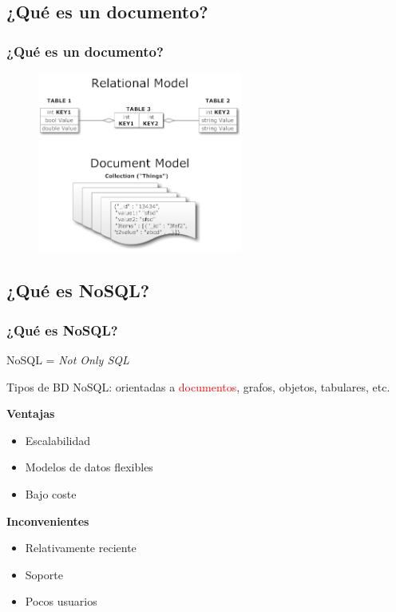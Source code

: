 \documentclass[serif,12pt]{beamer}
\begin{document}
\subsection{¿Qué es un documento?}
\begin{frame}
\frametitle{¿Qué es un documento?}

\begin{figure}
\centering
\includegraphics[width=0.6\textwidth, height=0.6\textheight]{images/document_vs_tables.png} 
\label{fig:document_vs_tables}
\end{figure}

\end{frame}
\subsection{¿Qué es NoSQL?}
\begin{frame}
\frametitle{¿Qué es NoSQL?}

\begin{center}
NoSQL = \emph{Not Only SQL}
\end{center}

Tipos de BD NoSQL: orientadas a \textcolor{red}{documentos}, grafos, objetos, tabulares, etc.\newline


\begin{multicols}{2}

\textbf{Ventajas}
\begin{itemize}
\item Escalabilidad
\item Modelos de datos flexibles
\item Bajo coste
\end{itemize}

\textbf{Inconvenientes}
\begin{itemize}
\item Relativamente reciente
\item Soporte
\item Pocos usuarios
\end{itemize}

\end{multicols}

\end{frame}
\end{document}

